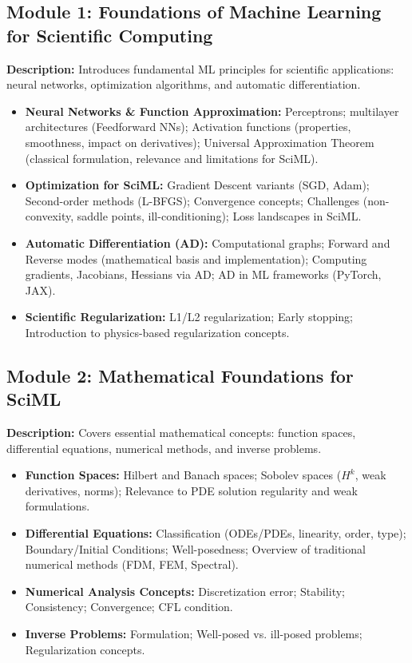 \documentclass[11pt,fourier]{article}
\begin{document}
\subsection*{Module 1: Foundations of Machine Learning for Scientific Computing}
\textbf{Description:} Introduces fundamental ML principles for scientific applications: neural networks, optimization algorithms, and automatic differentiation.
\begin{itemize}
    \item \textbf{Neural Networks \& Function Approximation:} Perceptrons; multilayer architectures (Feedforward NNs); Activation functions (properties, smoothness, impact on derivatives); Universal Approximation Theorem (classical formulation, relevance and limitations for SciML).
    \item \textbf{Optimization for SciML:} Gradient Descent variants (SGD, Adam); Second-order methods (L-BFGS); Convergence concepts; Challenges (non-convexity, saddle points, ill-conditioning); Loss landscapes in SciML.
    \item \textbf{Automatic Differentiation (AD):} Computational graphs; Forward and Reverse modes (mathematical basis and implementation); Computing gradients, Jacobians, Hessians via AD; AD in ML frameworks (PyTorch, JAX).
    \item \textbf{Scientific Regularization:} L1/L2 regularization; Early stopping; Introduction to physics-based regularization concepts.
\end{itemize}

\subsection*{Module 2: Mathematical Foundations for SciML}
\textbf{Description:} Covers essential mathematical concepts: function spaces, differential equations, numerical methods, and inverse problems.
\begin{itemize}
    \item \textbf{Function Spaces:} Hilbert and Banach spaces; Sobolev spaces ($H^k$, weak derivatives, norms); Relevance to PDE solution regularity and weak formulations.
    \item \textbf{Differential Equations:} Classification (ODEs/PDEs, linearity, order, type); Boundary/Initial Conditions; Well-posedness; Overview of traditional numerical methods (FDM, FEM, Spectral).
    \item \textbf{Numerical Analysis Concepts:} Discretization error; Stability; Consistency; Convergence; CFL condition.
    \item \textbf{Inverse Problems:} Formulation; Well-posed vs. ill-posed problems; Regularization concepts.
\end{itemize}
\end{document}
